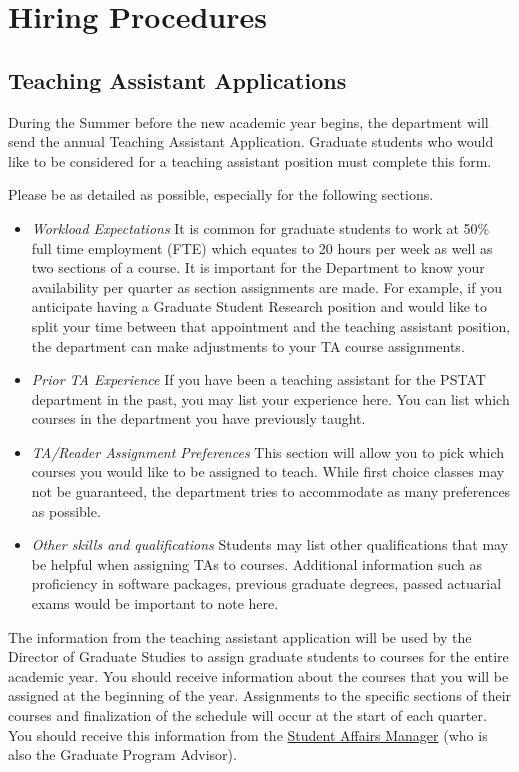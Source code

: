 \documentclass[
  letterpaper,
  DIV=11,
  numbers=noendperiod]{scrreprt}
\begin{document}
\part{\textbf{Hiring Procedures}}

\hypertarget{teaching-assistant-applications}{%
\chapter{Teaching Assistant
Applications}\label{teaching-assistant-applications}}

During the Summer before the new academic year begins, the department
will send the annual Teaching Assistant Application. Graduate students
who would like to be considered for a teaching assistant position must
complete this form.

Please be as detailed as possible, especially for the following
sections.

\begin{itemize}
\item
  \emph{Workload Expectations} It is common for graduate students to
  work at 50\% full time employment (FTE) which equates to 20 hours per
  week as well as two sections of a course. It is important for the
  Department to know your availability per quarter as section
  assignments are made. For example, if you anticipate having a Graduate
  Student Research position and would like to split your time between
  that appointment and the teaching assistant position, the department
  can make adjustments to your TA course assignments.
\item
  \emph{Prior TA Experience} If you have been a teaching assistant for
  the PSTAT department in the past, you may list your experience here.
  You can list which courses in the department you have previously
  taught.
\item
  \emph{TA/Reader Assignment Preferences} This section will allow you to
  pick which courses you would like to be assigned to teach. While first
  choice classes may not be guaranteed, the department tries to
  accommodate as many preferences as possible.
\item
  \emph{Other skills and qualifications} Students may list other
  qualifications that may be helpful when assigning TAs to courses.
  Additional information such as proficiency in software packages,
  previous graduate degrees, passed actuarial exams would be important
  to note here.
\end{itemize}

The information from the teaching assistant application will be used by
the Director of Graduate Studies to assign graduate students to courses
for the entire academic year. You should receive information about the
courses that you will be assigned at the beginning of the year.
Assignments to the specific sections of their courses and finalization
of the schedule will occur at the start of each quarter. You should
receive this information from the
\protect\hyperlink{sec-StaffandFacultyContact}{Student Affairs Manager}
(who is also the Graduate Program Advisor).
\end{document}
